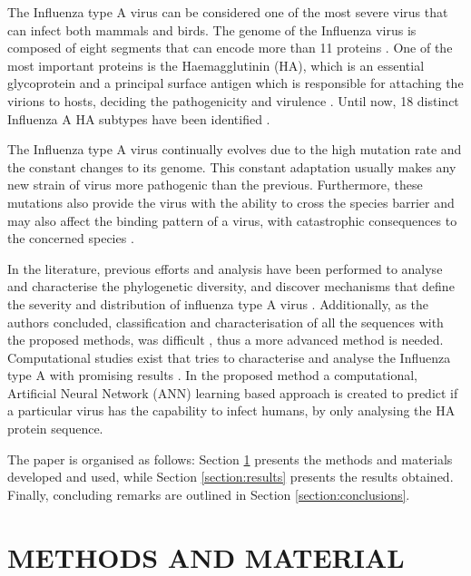 \documentclass[letterpaper, 10 pt, conference]{ieeeconf}  %
\begin{document}
The Influenza type A virus can be considered one of the most severe virus that can infect both mammals and birds. The genome of the Influenza virus is composed of eight segments that can encode more than 11 proteins \cite{webster1992evolution}. One of the most important proteins is the Haemagglutinin (HA), which is an essential glycoprotein and a principal surface antigen which is responsible for attaching the virions to hosts, deciding the pathogenicity and virulence \cite{webster1992evolution}.  Until now, 18 distinct Influenza A HA subtypes have been identified \cite{fouchier2005characterization, wu2014bat}. 

The Influenza type A virus continually evolves due to the high mutation rate and the constant changes to its genome.  This constant adaptation usually makes any new strain of virus more pathogenic than the previous. Furthermore, these mutations also provide the virus with the ability to cross the species barrier and may also affect the binding pattern of a virus, with catastrophic consequences to the concerned species \cite{nunthaboot2010evolution}.

In the literature, previous efforts and analysis have been performed to analyse and characterise the phylogenetic diversity, and discover mechanisms that define the severity and distribution of influenza type A virus \cite{chen2009panorama, liu2009panorama, shi2010complete}. Additionally, as the authors concluded, classification and characterisation of all the sequences with the proposed methods, was difficult \cite{chen2009panorama, liu2009panorama, shi2010complete}, thus a more advanced method is needed. Computational studies exist that tries to characterise and analyse the Influenza type A with promising results \cite{rehman2016characterization}. In the proposed method a computational, Artificial Neural Network (ANN) learning based approach is created to predict if a particular virus has the capability to infect humans, by only analysing the HA protein sequence.

The paper is organised as follows: Section \ref{section:methodsandmaterials} presents the methods and materials developed and used, while Section \ref{section:results} presents the results obtained. Finally, concluding remarks are outlined in Section \ref{section:conclusions}.




\section{METHODS AND MATERIAL}
\label{section:methodsandmaterials}
\end{document}
